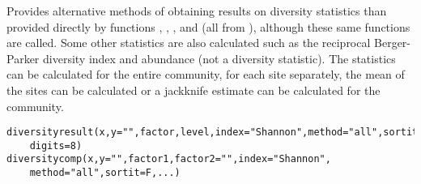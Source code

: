 \begin{Description}\relax
Provides alternative methods of obtaining results on diversity statistics than provided directly by functions , , ,  and  (all from ), although these same functions are called. Some other statistics are also calculated such as the reciprocal Berger-Parker diversity index and abundance (not a diversity statistic). The statistics can be calculated for the entire community, for each site separately, the mean of the sites can be calculated or a jackknife estimate can be calculated for the community.
\end{Description}
\begin{Usage}
\begin{verbatim}
diversityresult(x,y="",factor,level,index="Shannon",method="all",sortit=F,
    digits=8)
diversitycomp(x,y="",factor1,factor2="",index="Shannon",
    method="all",sortit=F,...)
\end{verbatim}
\end{Usage}
